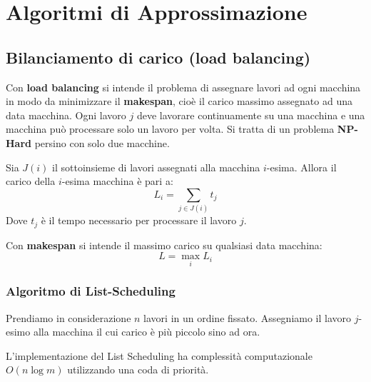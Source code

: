\documentclass[\main/main.tex]{subfiles}
\begin{document}
\chapter{Algoritmi di Approssimazione}
\section{Bilanciamento di carico (load balancing)}
Con \textbf{load balancing} si intende il problema di assegnare lavori ad ogni macchina in modo da minimizzare il \textbf{makespan}, cioè il carico massimo assegnato ad una data macchina. Ogni lavoro \(j\) deve lavorare continuamente su una macchina e una macchina può processare solo un lavoro per volta. Si tratta di un problema \textbf{NP-Hard} persino con solo due macchine.
\begin{definition}[Carico]
	Sia \(J(i)\) il sottoinsieme di lavori assegnati alla macchina \(i\)-esima.
	Allora il carico della \(i\)-esima macchina è pari a:
	\[
		L_i = \sum_{j \in J(i)} t_j
	\]
	Dove \(t_j\) è il tempo necessario per processare il lavoro \(j\).
\end{definition}
\begin{definition}[Makespan]
	Con \textbf{makespan} si intende il massimo carico su qualsiasi data macchina:
	\[
		L = \max_{i} L_i
	\]
\end{definition}
\subsection{Algoritmo di List-Scheduling}
Prendiamo in considerazione \(n\) lavori in un ordine fissato. Assegniamo il lavoro \(j\)-esimo alla macchina il cui carico è più piccolo sino ad ora.

\begin{complexity}
	L'implementazione del List Scheduling ha complessità computazionale \(O(n\log m)\) utilizzando una coda di priorità.
\end{complexity}
\end{document}
